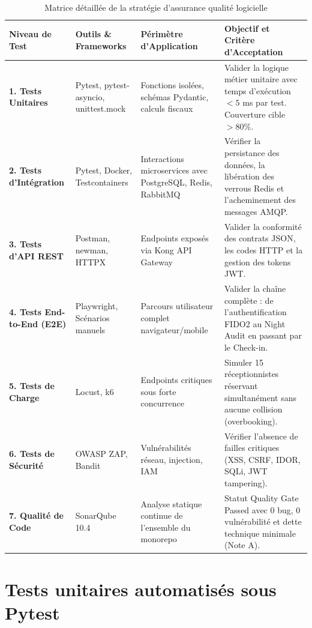 \begin{table}[H]
\centering
\small
\renewcommand{\arraystretch}{1.3}
\begin{tabularx}{\textwidth}{|p{3.2cm}|p{2.8cm}|p{3.2cm}|X|}
\hline
\textbf{Niveau de Test} & \textbf{Outils \& Frameworks} & \textbf{Périmètre d'Application} & \textbf{Objectif et Critère d'Acceptation} \\
\hline
\textbf{1. Tests Unitaires} & Pytest, pytest-asyncio, unittest.mock & Fonctions isolées, schémas Pydantic, calculs fiscaux & Valider la logique métier unitaire avec temps d'exécution $< 5$ ms par test. Couverture cible $> 80\%$. \\
\hline
\textbf{2. Tests d'Intégration} & Pytest, Docker, Testcontainers & Interactions microservices avec PostgreSQL, Redis, RabbitMQ & Vérifier la persistance des données, la libération des verrous Redis et l'acheminement des messages AMQP. \\
\hline
\textbf{3. Tests d'API REST} & Postman, newman, HTTPX & Endpoints exposés via Kong API Gateway & Valider la conformité des contrats JSON, les codes HTTP et la gestion des tokens JWT. \\
\hline
\textbf{4. Tests End-to-End (E2E)} & Playwright, Scénarios manuels & Parcours utilisateur complet navigateur/mobile & Valider la chaîne complète : de l'authentification FIDO2 au Night Audit en passant par le Check-in. \\
\hline
\textbf{5. Tests de Charge} & Locust, k6 & Endpoints critiques sous forte concurrence & Simuler 15 réceptionnistes réservant simultanément sans aucune collision (overbooking). \\
\hline
\textbf{6. Tests de Sécurité} & OWASP ZAP, Bandit & Vulnérabilités réseau, injection, IAM & Vérifier l'absence de failles critiques (XSS, CSRF, IDOR, SQLi, JWT tampering). \\
\hline
\textbf{7. Qualité de Code} & SonarQube 10.4 & Analyse statique continue de l'ensemble du monorepo & Statut Quality Gate Passed avec 0 bug, 0 vulnérabilité et dette technique minimale (Note A). \\
\hline
\end{tabularx}
\caption{Matrice détaillée de la stratégie d'assurance qualité logicielle}
\label{tab:pyramide_tests_detail}
\end{table}

\section{Tests unitaires automatisés sous Pytest}


